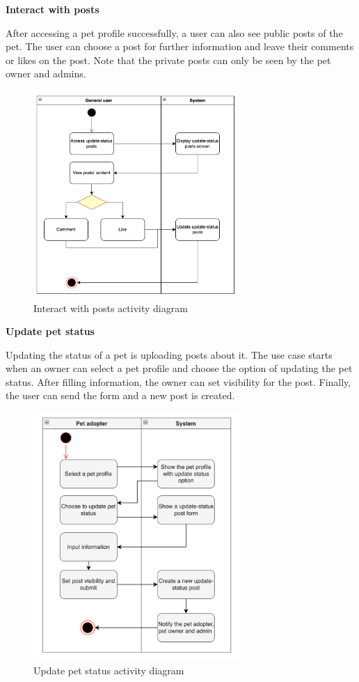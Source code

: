 \textbf{Interact with posts}

After accessing a pet profile successfully, a user can also see public posts of the pet. The user can choose a post for further information and leave their comments or likes on the post. Note that the private posts can only be seen by the pet owner and admins.

\begin{figure}[H]
  \centering
  \includegraphics[width=0.7\textwidth]{Figures/post_interact.png}
  \caption{Interact with posts activity diagram}
  \label{fig:interact-post}
\end{figure}


\textbf{Update pet status}

Updating the status of a pet is uploading posts about it. The use case starts when an owner can select a pet profile and choose the option of updating the pet status. After filling information, the owner can set visibility for the post. Finally, the user can send the form and a new post is created.

\begin{figure}[H]
  \centering
  \includegraphics[width=0.7\textwidth]{Figures/pet_status.png}
  \caption{Update pet status activity diagram}
  \label{fig:update-pet-status}
\end{figure}

